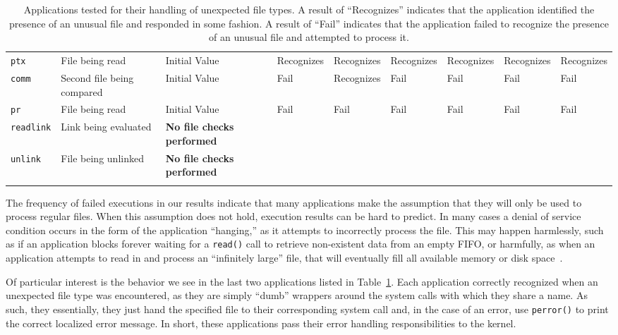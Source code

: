 \begin{table}[t]
\begin{tabular}{l  l  |  l  l  l  l  l  l  l}
        {\tt ptx}         & File being read            & Initial Value  & Recognizes     & Recognizes  & Recognizes & Recognizes  & Recognizes & Recognizes\\
        {\tt comm}        & Second file being compared & Initial Value  & Fail           & Recognizes  & Fail       & Fail        & Fail       & Fail\\
        {\tt pr}          & File being read            & Initial Value  & Fail           & Fail        & Fail       & Fail        & Fail       & Fail\\
\hline
        {\tt readlink}    & Link being evaluated       & \textbf{No file checks performed} & & & & & & \\
        {\tt unlink}      & File being unlinked        & \textbf{No file checks performed} & & & & & & \\
    \bottomrule{}
    \end{tabular}
    \caption{Applications tested for their handling of unexpected file types.  A
    result of ``Recognizes'' indicates that the application identified the
    presence of an unusual file and responded in some fashion.  A result of
    ``Fail'' indicates that the application failed to recognize the presence of
    an unusual file and attempted to process it.}
    \label{table:unexpectedtypes}
\end{table}

The frequency of failed executions in our results indicate that many
applications make the assumption that they will only be used to process
regular files.  When this assumption does not hold, execution results
can be hard to predict.  In many cases a denial of
service condition occurs in the form of the application ``hanging,'' as it
attempts to incorrectly process the file.  This may happen harmlessly, such
as if an application blocks forever waiting for a {\tt read()}
call to retrieve non-existent data from an empty FIFO, or harmfully, as
when an application attempts to read in and process an
``infinitely large'' file, that will eventually fill all
available memory or disk
space~\cite{Cappos_CCS_08}.

Of particular interest is the behavior we see in the last two applications
listed in Table~\ref{table:unexpectedtypes}.  Each application correctly
recognized when an unexpected file type was encountered, as they
are simply ``dumb'' wrappers around the system calls
with which they share a name.  As such, they essentially,
they just hand the specified
file to their corresponding system call and, in the case of an error, use
{\tt perror()} to print the correct localized error message.  In short,
these applications pass their error handling responsibilities to the
kernel.

